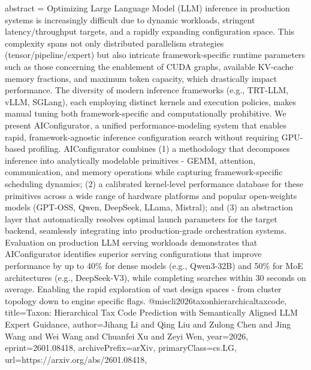 {      abstract = {Optimizing Large Language Model (LLM) inference in production systems is increasingly difficult due to dynamic workloads, stringent latency/throughput targets, and a rapidly expanding configuration space. This complexity spans not only distributed parallelism strategies (tensor/pipeline/expert) but also intricate framework-specific runtime parameters such as those concerning the enablement of CUDA graphs, available KV-cache memory fractions, and maximum token capacity, which drastically impact performance. The diversity of modern inference frameworks (e.g., TRT-LLM, vLLM, SGLang), each employing distinct kernels and execution policies, makes manual tuning both framework-specific and computationally prohibitive. We present AIConfigurator, a unified performance-modeling system that enables rapid, framework-agnostic inference configuration search without requiring GPU-based profiling. AIConfigurator combines (1) a methodology that decomposes inference into analytically modelable primitives - GEMM, attention, communication, and memory operations while capturing framework-specific scheduling dynamics; (2) a calibrated kernel-level performance database for these primitives across a wide range of hardware platforms and popular open-weights models (GPT-OSS, Qwen, DeepSeek, LLama, Mistral); and (3) an abstraction layer that automatically resolves optimal launch parameters for the target backend, seamlessly integrating into production-grade orchestration systems. Evaluation on production LLM serving workloads demonstrates that AIConfigurator identifies superior serving configurations that improve performance by up to 40\% for dense models (e.g., Qwen3-32B) and 50\% for MoE architectures (e.g., DeepSeek-V3), while completing searches within 30 seconds on average. Enabling the rapid exploration of vast design spaces - from cluster topology down to engine specific flags.}
}@misc{li2026taxonhierarchicaltaxcode,
      title={Taxon: Hierarchical Tax Code Prediction with Semantically Aligned LLM Expert Guidance}, 
      author={Jihang Li and Qing Liu and Zulong Chen and Jing Wang and Wei Wang and Chuanfei Xu and Zeyi Wen},
      year={2026},
      eprint={2601.08418},
      archivePrefix={arXiv},
      primaryClass={cs.LG},
      url={https://arxiv.org/abs/2601.08418},
}
